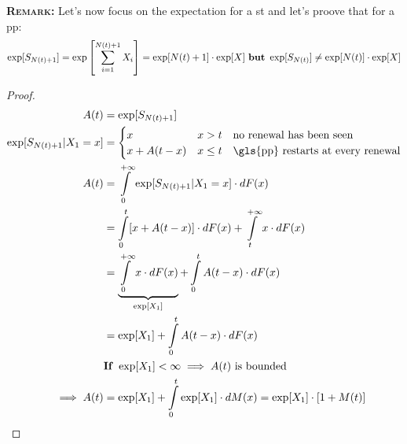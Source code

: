 \textbf{\textsc{Remark:}}
Let's now focus on the expectation for a \gls{st} and let's proove that for a \gls{pp}:
\begin{equation}
  \exp[S_{N(t)+1}] = \exp\left[\sum\limits_{i=1}^{N(t)+1}X_i\right] = \exp[N(t)+1]\cdot \exp[X] \text{  \textbf{but}  } \exp[S_{N(t)}] \neq \exp[N(t)]\cdot \exp[X]
\end{equation}

\begin{proof}
  \begin{equation}\begin{split}
    A(t) &= \exp[S_{N(t)+1}]\\
    \exp[S_{N(t)+1}|X_1=x] &=
    \begin{cases}
      x & x>t \quad \text{no renewal has been seen} \\
      x + A(t-x) & x \le t \quad \text{\gls{pp} restarts at every renewal}
    \end{cases} \\
    A(t) &= \int\limits_0^{+\infty} \exp[S_{N(t)+1}|X_1 = x] \cdot dF(x) \\
    &= \int\limits_0^{t} [x+ A(t-x)] \cdot dF(x) + \int\limits_t^{+\infty} x \cdot dF(x) \\
    &= \underbrace{\int\limits_0^{+\infty} x \cdot dF(x)}_{\exp[X_1]} + \int\limits_0^{t} A(t-x) \cdot dF(x) \\
    &= \exp[X_1] + \int\limits_0^{t} A(t-x) \cdot dF(x)\\
    & \text{\textbf{If} }\exp[X_1] < \infty \implies A(t) \text{ is bounded} \\
    \implies A(t) &= \exp[X_1] + \int\limits_0^{t} \exp[X_1] \cdot dM(x) = \exp[X_1]\cdot [1+M(t)]\\
  \end{split}\end{equation}
\end{proof}

